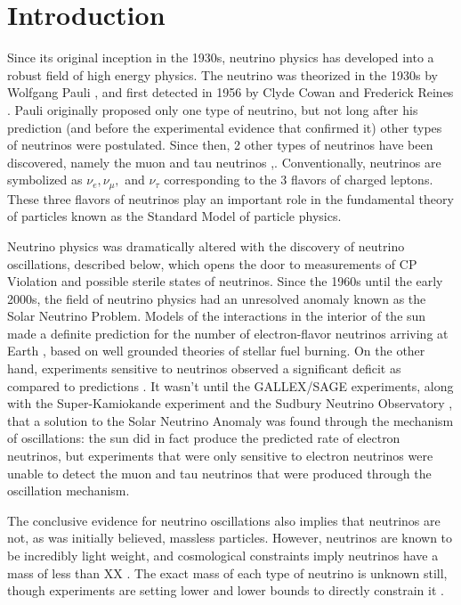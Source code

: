 
\chapter{Introduction}


Since its original inception in the 1930s, neutrino physics has developed into a robust field of high energy physics.  The neutrino was theorized in the 1930s by Wolfgang Pauli \cite{Pauli}, and first detected in 1956 by Clyde Cowan and Frederick Reines \cite{cowanReines}.   Pauli originally proposed only one type of neutrino, but not long after his prediction (and before the experimental evidence that confirmed it) other types of neutrinos were postulated.   Since then, 2 other types of neutrinos have been discovered, namely the muon and tau neutrinos \cite{muon_neutrino},\cite{tau_neutrino}.  Conventionally, neutrinos are symbolized as $\nu_e, \nu_\mu,$ and $\nu_\tau$ corresponding to the 3 flavors of charged leptons.  These three flavors of neutrinos play an important role in the fundamental theory of particles known as the Standard Model of particle physics.

Neutrino physics was dramatically altered with the discovery of neutrino oscillations, described below, which opens the door to measurements of CP Violation and possible sterile states of neutrinos.  Since the 1960s until the early 2000s, the field of neutrino physics had an unresolved anomaly known as the Solar Neutrino Problem.  Models of the interactions in the interior of the sun made a definite prediction for the number of electron-flavor neutrinos arriving at Earth \cite{solar_neutrinos}, based on well grounded theories of stellar fuel burning.  On the other hand, experiments sensitive to neutrinos observed a significant deficit as compared to predictions \cite{davis}.  It wasn't until the GALLEX/SAGE \cite{gallex} \cite{sage} experiments, along with the Super-Kamiokande experiment \cite{superK} and the Sudbury Neutrino Observatory \cite{SNO}, that a solution to the Solar Neutrino Anomaly was found through the mechanism of oscillations: the sun did in fact produce the predicted rate of electron neutrinos, but experiments that were only sensitive to electron neutrinos were unable to detect the muon and tau neutrinos that were produced through the oscillation mechanism.  

The conclusive evidence for neutrino oscillations also implies that neutrinos are not, as was initially believed, massless particles.  However, neutrinos are known to be incredibly light weight, and cosmological constraints imply neutrinos have a mass of less than  XX \cite{cosmological_neutrinos}.  The exact mass of each type of neutrino is unknown still, though experiments are setting lower and lower bounds to directly constrain it \cite{katrin}.

